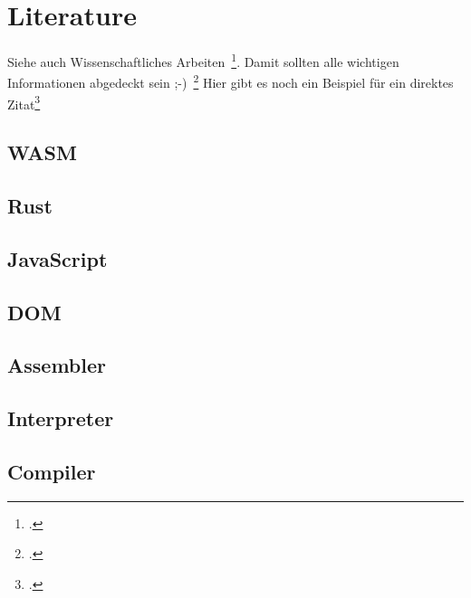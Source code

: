 \newpage
\section{Literature} \label{infos}
Siehe auch Wissenschaftliches Arbeiten~\footcite[\vglf][S. 1]{Balzert.2008}. %
Damit sollten alle wichtigen Informationen abgedeckt sein ;-)~\footcite[\vglf][]{Balzert.2008} %
Hier gibt es noch ein Beispiel für ein direktes Zitat\footcite[][]{Balzert.2008} %

\subsection{WASM} \label{wasm}

\subsection{Rust} \label{rust}

\subsection{JavaScript} \label{javascript}

\subsection{DOM} \label{dom}

\subsection{Assembler} \label{assembler}

\subsection{Interpreter} \label{interpreter}

\subsection{Compiler} \label{compiler}
